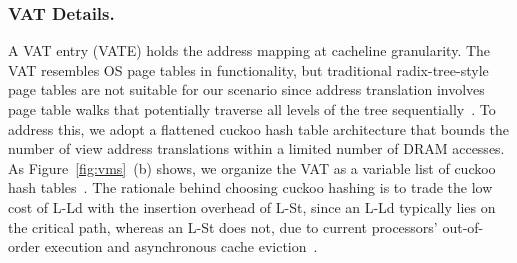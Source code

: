 


\subsubsection{VAT Details. }

A VAT entry (VATE) holds the address mapping at cacheline granularity. The VAT resembles OS page tables in functionality, but traditional radix-tree-style page tables are not suitable for our scenario since address translation involves page table walks that potentially traverse all levels of the tree sequentially~\cite{cuckoo_pagetable_asplos20, clio_asplos22}. To address this, we adopt a flattened cuckoo hash table architecture that bounds the number of view address translations within a limited number of DRAM accesses. 
As Figure~\ref{fig:vms}~(b) shows, we organize the VAT as a variable list of cuckoo hash tables~\cite{cuckoo_hash, cuckoo_pagetable_asplos20}. 
The rationale behind choosing cuckoo hashing is to trade the low cost of L-Ld with the insertion overhead of L-St, 
since an L-Ld typically lies on the critical path, whereas an L-St does not, due to current processors' out-of-order execution and asynchronous cache eviction~\cite{book_cc, rvweak_isca18, rvweak_pact17, quantitative_approach}.


